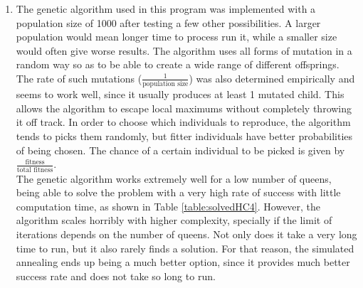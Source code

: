 \documentclass{article}
\begin{document}
\begin{enumerate}
\item The genetic algorithm used in this program was implemented with a population size of 1000 after testing a few other possibilities. A larger population would mean longer time to process run it, while a smaller size would often give worse results. The algorithm uses all forms of mutation in a random way so as to be able to create a wide range of different offsprings. The rate of such mutations ($\frac{1}{\text{population size}}$) was also determined empirically and seems to work well, since it usually produces at least 1 mutated child. This allows the algorithm to escape local maximums without completely throwing it off track. In order to choose which individuals to reproduce, the algorithm tends to picks them randomly, but fitter individuals have better probabilities of being chosen. The chance of a certain individual to be picked is given by $\frac{\text{fitness}}{\text{total fitness}}$.\\
The genetic algorithm works extremely well for a low number of queens, being able to solve the problem with a very high rate of success with little computation time, as shown in Table \ref{table:solvedHC4}. However, the algorithm scales horribly with higher complexity, specially if the limit of iterations depends on the number of queens. Not only does it take a very long time to run, but it also rarely finds a solution. For that reason, the simulated annealing ends up being a much better option, since it provides much better success rate and does not take so long to run.

\begin{table}[ht]
\end{table}
\end{enumerate}
\end{document}
